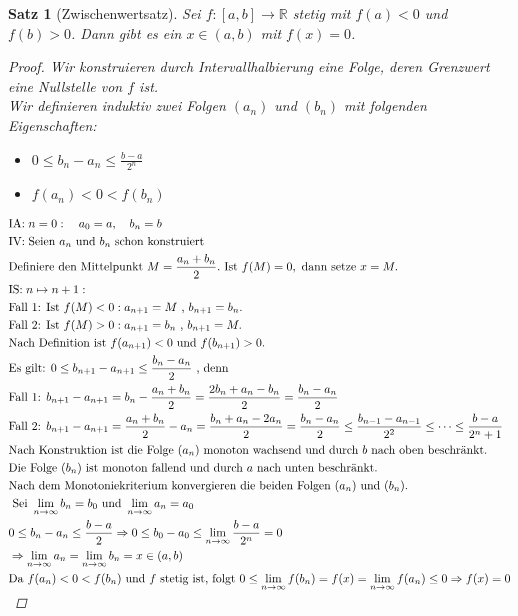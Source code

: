 \documentclass[a4paper,titlepage,oneside]{article}
\def\R{\ensuremath{\mathbb{R}} }
\newcommand{\IA}[1][n=0]{\vspace{0.1pt}\ensuremath{\text{IA:}\sp#1:}}
\newcommand{\IV}{\vspace{0.1pt}\ensuremath{\text{IV:}\sp}}
\newcommand{\IS}[1][n \mapsto n+1]{\vspace{0.1pt}\ensuremath{\text{IS:}\sp#1:}}
\def\sp{\hspace{0,1cm}}
\renewcommand{\liminf}[2][n]{\ensuremath{\lim\limits_{#1 \rightarrow \infty}{#2}}}
\theoremstyle{thmstyle}
\newtheorem{satz}{Satz}[section]
\theoremstyle{subthmstyle}
\begin{document}
\begin{satz}[Zwischenwertsatz]
Sei $f:[a,b] \to \R$ stetig mit $f(a) < 0$ und $f(b) > 0$. Dann gibt es ein $ x \in (a,b)$ mit $f(x) = 0$.
\begin{proof}
Wir konstruieren durch Intervallhalbierung eine Folge, deren Grenzwert eine Nullstelle von $f$ ist. \\
Wir definieren induktiv zwei Folgen $(a_n)$ und $(b_n)$ mit folgenden Eigenschaften:
\begin{itemize}
\item $0 \le b_n - a_n \le \frac{b-a}{2^n}$
\item $f(a_n) < 0 < f(b_n)$
\end{itemize}
\begin{math}\displaystyle \begin{aligned}[t]
&\IA \quad a_0 = a, \quad b_n = b \\
&\IV{\text{Seien $a_n$ und $b_n$ schon konstruiert}} \\
&\text{Definiere den Mittelpunkt }M = \frac{a_n + b_n}{2}. \text{ Ist } f(M) = 0, \text{ dann setze } x = M .\\
&\IS \\
&\text{Fall 1: Ist } f(M) < 0 : a_{n+1} = M \text{ , } b_{n+1} = b_n. \\
&\text{Fall 2: Ist } f(M) > 0 : a_{n+1} = b_n \text{ , } b_{n+1} = M.  \\
&\text{Nach Definition ist } f(a_{n+1}) < 0 \text{ und } f(b_{n+1}) > 0. \\
&\text{Es gilt: } 0 \le b_{n+1} - a_{n+1} \le \frac{b_n - a_n}{2} \text{ , denn} \\
&\text{Fall 1: } b_{n+1} - a_{n+1} = b_n - \frac{a_n+b_n}{2} = \frac{2b_n + a_n - b_n}{2} = \frac{b_n - a_n}{2} \\
&\text{Fall 2: } b_{n+1} - a_{n+1} = \frac{a_n+b_n}{2} - a_n = \frac{b_n + a_n - 2a_n}{2} = \frac{b_n - a_n}{2}
\le \frac{b_{n-1} - a_{n-1}}{2^2} \le \dots \le \frac{b-a}{2^n+1} \\
&\text{Nach Konstruktion ist die Folge $(a_n)$ monoton wachsend und durch $b$ nach oben beschränkt.} \\
&\text{Die Folge $(b_n)$ ist monoton fallend und durch $a$ nach unten beschränkt.} \\
&\text{Nach dem Monotoniekriterium konvergieren die beiden Folgen $(a_n)$ und $(b_n)$.} \\
&\text{ Sei } \liminf{b_n} = b_0 \text{ und } \liminf{a_n}  = a_0 \\
&0 \le b_n - a_n \le \frac{b-a}{2} \Rightarrow 0 \le b_0 - a_0 \le \liminf{\frac{b-a}{2^n}} = 0 \\
&\Rightarrow \liminf{a_n} = \liminf{b_n} = x \in (a,b) \\
&\text{Da } f(a_n) < 0 < f(b_n) \text{ und } f \text{ stetig ist, folgt } 0 \le \liminf{f(b_n)} = f(x) = \liminf{f(a_n)} \le 0 \Rightarrow f(x) = 0
\end{aligned}\end{math} 
\end{proof}
\end{satz}
\end{document}
